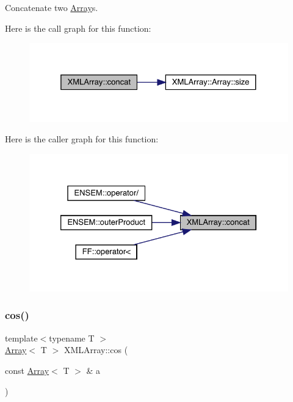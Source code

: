 Concatenate two \mbox{\hyperlink{classXMLArray_1_1Array}{Array}}\textquotesingle{}s. 

Here is the call graph for this function\+:\nopagebreak
\begin{figure}[H]
\begin{center}
\leavevmode
\includegraphics[width=325pt]{dd/db1/namespaceXMLArray_af16029dd462356447ca4c8264203335a_cgraph}
\end{center}
\end{figure}
Here is the caller graph for this function\+:\nopagebreak
\begin{figure}[H]
\begin{center}
\leavevmode
\includegraphics[width=326pt]{dd/db1/namespaceXMLArray_af16029dd462356447ca4c8264203335a_icgraph}
\end{center}
\end{figure}
\mbox{\label{namespaceXMLArray_afae227c9b7f0e447f5e058acd82cc580}} 
\subsubsection{\texorpdfstring{cos()}{cos()}}
{\footnotesize\ttfamily template$<$typename T $>$ \\
\mbox{\hyperlink{classXMLArray_1_1Array}{Array}}$<$ T $>$ X\+M\+L\+Array\+::cos (\begin{DoxyParamCaption}\item[{const \mbox{\hyperlink{classXMLArray_1_1Array}{Array}}$<$ T $>$ \&}]{a }\end{DoxyParamCaption})\hspace{0.3cm}{\ttfamily [inline]}}



